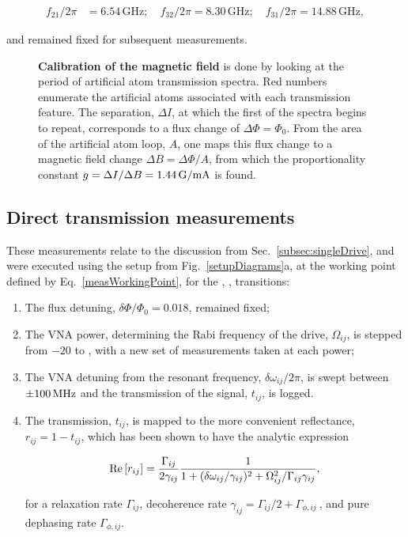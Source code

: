   \begin{equation}\label{measWorkingPoint}
  \begin{aligned}
  	f_{21}/2\pi &= 6.54\,\text{GHz};\quad  	{f_{32}/2\pi} = 8.30{\,\text{GHz}};\quad  	f_{31}/2\pi = 14.88\,\text{GHz},
  \end{aligned}
  \end{equation}
  
  \noindent and remained fixed for subsequent measurements.
 
 \begin{figure}
	 \caption{\small\textbf{Calibration of the magnetic field} is done by looking at the period of artificial atom transmission spectra. Red numbers enumerate the artificial atoms associated with each transmission feature. The separation, $ \Delta I $, at which the first of the spectra begins to repeat, corresponds to a flux change of $ \Delta\Phi=\Phi_0 $. From the area of the artificial atom loop, $ A $, one maps this flux change to a magnetic field change $ \Delta B = \Delta\Phi/A$, from which the proportionality constant $ g = \Delta I/\Delta B =  1.44\,\text{G/mA} $ is found.}
	 \label{measCurrent}
 \end{figure} 

 
 
 \subsection{Direct transmission measurements\label{subsec:DirectTransmission}}
  These measurements relate to the discussion from Sec.~\ref{subsec:singleDrive}, and were executed using the setup from Fig.~\ref{setupDiagrams}a, at the working point defined by Eq.~\eqref{measWorkingPoint}, for the \lra{}, \lra{}, transitions:
  
  \begin{enumerate}
  	\item The flux detuning, $ \delta\Phi/\Phi_0=0.018 $, remained fixed;
  	\item The VNA power, determining the Rabi frequency of the drive, $ \Omega_{ij} $, is stepped from $ -20 $ to , with a new set of measurements taken at each power;
  	\item The VNA detuning from the resonant frequency, $ \delta\omega_{ij}/2\pi $, is swept between $ \pm100\,\text{MHz} $ and the transmission of the signal, $ t_{ij} $, is logged.
  	\item The transmission, $ t_{ij} $, is mapped to the more convenient reflectance, $ r_{ij}= 1-t_{ij} $, which has been shown to have the analytic expression
  	
  	\begin{equation}\label{measReflectanceAgain}
  		\text{Re}\left[r_{ij}\right] = \frac{\Gamma_{ij}}{2\gamma_{ij}}\frac{1}{1+(\delta\omega_{ij}/\gamma_{ij})^2+\Omega_{ij}^2/\Gamma_{ij}\gamma_{ij}},
  	\end{equation}
  	
  	\noindent for a \ra{} relaxation rate $ \Gamma_{ij} $, decoherence rate $ \gamma_{ij}=\Gamma_{ij}/2+\Gamma_{\phi,ij}\ $, and pure dephasing rate $ \Gamma_{\phi,ij} $. 
\end{enumerate}

